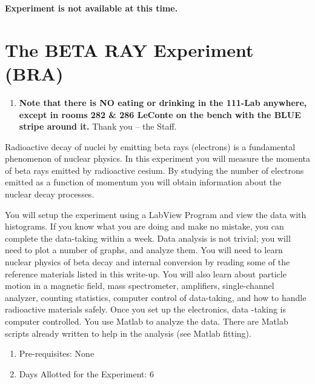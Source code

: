 \documentclass{../lab}
\begin{document}
\maketitle

\vspace{3cm}
\centerline{\Huge \bf Experiment is not available at this time.}

\newpage

\tableofcontents

\section{The BETA RAY Experiment (BRA)}

\begin{enumerate}
    \item \textbf{Note that there is NO eating or drinking in the 111-Lab anywhere, except in rooms 282 \& 286 LeConte on the bench with the BLUE stripe around it.} Thank you -- the Staff.
\end{enumerate}

Radioactive decay of nuclei by emitting beta rays (electrons) is a fundamental phenomenon of nuclear physics. In this experiment you will measure the momenta of beta rays emitted by radioactive cesium. By studying the number of electrons emitted as a function of momentum you will obtain information about the nuclear decay processes.

You will setup the experiment using a LabView Program and view the data with histograms. If you know what you are doing and make no mistake, you can complete the data-taking within a week. Data analysis is not trivial; you will need to plot a number of graphs, and analyze them. You will need to learn nuclear physics of beta decay and internal conversion by reading some of the reference materials listed in this write-up. You will also learn about particle motion in a magnetic field, mass spectrometer, amplifiers, single-channel analyzer, counting statistics, computer control of data-taking, and how to handle radioactive materials safely. Once you set up the electronics, data -taking is computer controlled. You use Matlab to analyze the data. There are Matlab scripts already written to help in the analysis (see Matlab fitting).

\begin{enumerate}
    \item Pre-requisites: None

    \item Days Allotted for the Experiment: 6
\end{enumerate}
\end{document}
